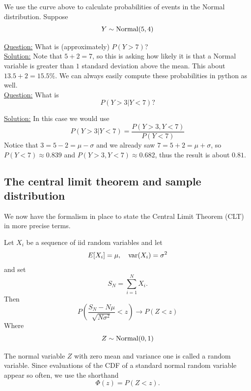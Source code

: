 \begin{example}
 We use the curve above to calculate probabilities of events in the Normal distribution. Suppose
\begin{equation*}
Y \sim {\rm Normal}(5,4)\\
\end{equation*}


 \noindent
\underline{Question:} What is (approximately) $P(Y > 7)$? \\

 \noindent
\underline{Solution:} Note that $5 + 2 =  7$, so this is asking how likely it is that a Normal variable is greater than $1$ standard deviation above the mean. This about $13.5+2 = 15.5\%$. We can always easily compute these probabilities in python as well.\\ 



 \noindent
\underline{Question:} What is
\begin{equation*}
P(Y>3|Y<7)?
\end{equation*}

 \noindent
\underline{Solution:} In this case we would use
\begin{equation*}
P(Y>3|Y<7) = \frac{P(Y>3,Y<7)}{P(Y<7)} 
\end{equation*}
Notice that $3 = 5-2 = \mu-\sigma$ and we already saw $7 = 5+2 = \mu+\sigma$, so $P(Y<7) \approx 0.839$ and $P(Y>3,Y<7) \approx 0.682$, thus the result is about $0.81$. 



\end{example}



  
  \subsection{The central limit theorem and sample distribution}
  
  
 We now have the formalism in place to state the Central Limit Theorem (CLT) in more precise terms. 
 \begin{thm} Let $X_i$ be a sequence of iid random variables and let 
 \begin{equation*}
E[X_i] = \mu,\quad  {\rm var}(X_i) = \sigma^2
 \end{equation*}
  and set 
  \begin{equation*}
 S_N = \sum_{i=1}^N X_i.
 \end{equation*}
 Then 
 \begin{equation}\label{eq:clt}
P\left( \frac{S_N-N\mu}{\sqrt{N \sigma^2}}<z\right) \to P(Z<z) 
 \end{equation}
Where
\begin{equation*}
Z \sim {\rm Normal}(0,1)
\end{equation*}
 \end{thm}
 The normal variable $Z$ with zero mean and variance one is called a  random variable. Since evaluations of the CDF of a standard normal random variable appear so often, we use the shorthand 
 \begin{equation*}
 \Phi(z) = P(Z<z).
 \end{equation*}

